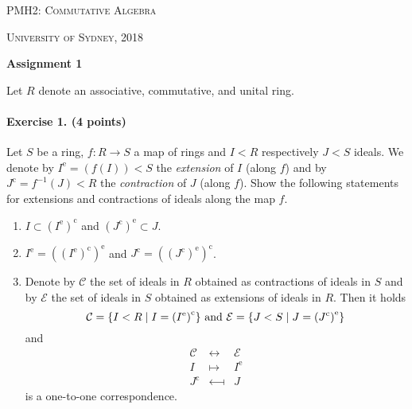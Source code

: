 \documentclass[12pt,a4paper]{article}
\begin{document}
\pagestyle{fancy}

\vspace{-.5cm}
\centerline{ \textsc{\Large PMH2: Commutative Algebra} }
\centerline{ \textsc{University of Sydney, 2018}}

\vspace{.3cm}

\begin{center}
  {\large\bf Assignment 1}\\
\end{center}


\begin{center}
Let $R$ denote an associative, commutative, and unital ring.
\end{center}

\paragraph{Exercise 1. (4 points)}
Let $S$ be a ring, $f:R \longrightarrow S$ a map of rings and $I < R$ respectively $J < S$ ideals. We denote by $I^\mathrm{e} = (f(I)) < S$ the \emph{extension} of $I$ (along $f$) and by $J^\mathrm{c}=f^{-1}(J) < R$ the \emph{contraction} of $J$ (along $f$). Show the following statements for extensions and contractions of ideals along the map $f$.
\begin{enumerate}
\item $I \subset {\left(I^{\mathrm{e}}\right)}^\mathrm{c}$ and ${\left(J^{\mathrm{c}}\right)}^\mathrm{e} \subset J$.
\item $I^\mathrm{e} = \left({\left(I^{\mathrm{e}}\right)}^\mathrm{c}\right)^\mathrm{e}$ and $J^\mathrm{c} = \left({\left(J^{\mathrm{c}}\right)}^\mathrm{e}\right)^\mathrm{c}$.
\item Denote by $\mathcal{C}$ the set of ideals in $R$ obtained as contractions of ideals in $S$ and by $\mathcal{E}$ the set of ideals in $S$ obtained as extensions of ideals in $R$. Then it holds
\[
\mathcal{C}=\{ I < R \mid I = {\left(I^{\mathrm{e}}\right)}^\mathrm{c} \}\text{ and } \mathcal{E}=\{ J < S \mid J = {\left(J^{\mathrm{c}}\right)}^\mathrm{e}\}\\
\]
and
\begin{eqnarray*}
\mathcal{C}&\longleftrightarrow& \mathcal{E}\\
I & \longmapsto & I^\mathrm{e}\\
J^\mathrm{c} & \longmapsfrom & J
\end{eqnarray*}
is a one-to-one correspondence.
\end{enumerate}
\end{document}
